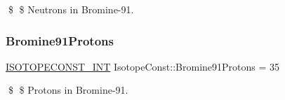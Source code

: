 \$ \$ Neutrons in Bromine-\/91. \mbox{\label{group___isotope_const-_bromine-_br91_ga5c98405b62ac5729d62b43ed0e02926a}} 
\subsubsection{\texorpdfstring{Bromine91\+Protons}{Bromine91Protons}}
{\footnotesize\ttfamily \mbox{\hyperlink{group___isotope_const-_macros_ga5f18360b3e99483a35c32d789e62621c}{I\+S\+O\+T\+O\+P\+E\+C\+O\+N\+S\+T\+\_\+\+I\+NT}} Isotope\+Const\+::\+Bromine91\+Protons = 35}

\$ \$ Protons in Bromine-\/91. 